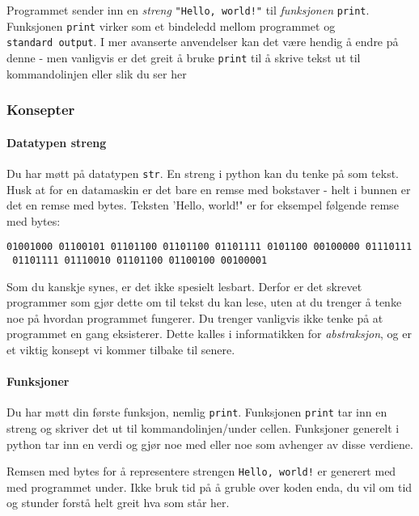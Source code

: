 \documentclass[11pt]{article}
\begin{document}
Programmet sender inn en \emph{streng} \texttt{"Hello,\ world!"} til
\emph{funksjonen} \texttt{print}. Funksjonen \texttt{print} virker som
et bindeledd mellom programmet og \texttt{standard\ output}. I mer
avanserte anvendelser kan det være hendig å endre på denne - men
vanligvis er det greit å bruke \texttt{print} til å skrive tekst ut til
kommandolinjen eller slik du ser her

    \hypertarget{konsepter}{%
\subsubsection{Konsepter}\label{konsepter}}

    \hypertarget{datatypen-streng}{%
\paragraph{Datatypen streng}\label{datatypen-streng}}

Du har møtt på datatypen \texttt{str}. En streng i python kan du tenke
på som tekst. Husk at for en datamaskin er det bare en remse med
bokstaver - helt i bunnen er det en remse med bytes. Teksten 'Hello,
world!" er for eksempel følgende remse med bytes:

\texttt{01001000\ 01100101\ 01101100\ 01101100\ 01101111\ 0101100\ 00100000\ 01110111\ 01101111\ 01110010\ 01101100\ 01100100\ 00100001}

    Som du kanskje synes, er det ikke spesielt lesbart. Derfor er det
skrevet programmer som gjør dette om til tekst du kan lese, uten at du
trenger å tenke noe på hvordan programmet fungerer. Du trenger vanligvis
ikke tenke på at programmet en gang eksisterer. Dette kalles i
informatikken for \emph{abstraksjon}, og er et viktig konsept vi kommer
tilbake til senere.

    \hypertarget{funksjoner}{%
\paragraph{Funksjoner}\label{funksjoner}}

Du har møtt din første funksjon, nemlig \texttt{print}. Funksjonen
\texttt{print} tar inn en streng og skriver det ut til
kommandolinjen/under cellen. Funksjoner generelt i python tar inn en
verdi og gjør noe med eller noe som avhenger av disse verdiene.

    Remsen med bytes for å representere strengen \texttt{Hello,\ world!} er
generert med med programmet under. Ikke bruk tid på å gruble over koden
enda, du vil om tid og stunder forstå helt greit hva som står her.
\end{document}

